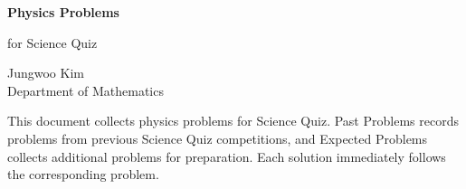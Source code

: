 \documentclass[11pt,oneside]{article}
\begin{document}
    \thispagestyle{empty}

    \begin{center}
        \vspace*{1.1cm}

        {\LARGE\bfseries Physics Problems\par}

        \vspace{0.25cm}

        {\large for Science Quiz\par}

        \vspace{0.75cm}

        {\normalsize
        Jungwoo Kim\\
        Department of Mathematics\\
        \PohangUniversityOfScienceAndTechnology
        \par}

    \end{center}

    \vspace{0.45cm}

    This document collects physics problems for Science Quiz. Past Problems
    records problems from previous Science Quiz competitions, and Expected
    Problems collects additional problems for preparation. Each solution
    immediately follows the corresponding problem.

    \vspace{0.45cm}

    \tableofcontents

    
    
\end{document}
